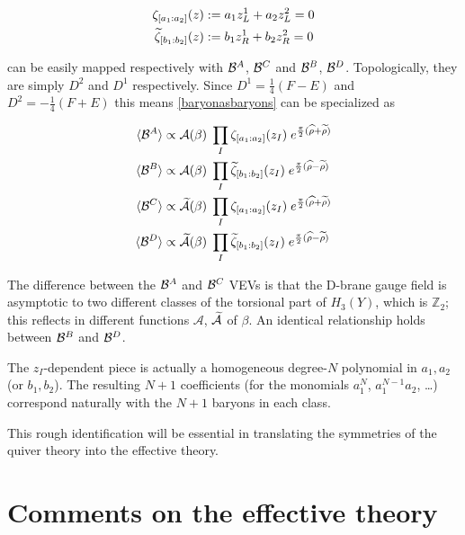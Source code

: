 \begin{align}
	\zeta_{[a_1:a_2]} (z) &:= a_1 z_L^1 + a_2 z_L^2 = 0\\
	\widetilde{\zeta}_{[b_1:b_2]} (z) &:= b_1 z_R^1 + b_2 z_R^2 = 0
	\label{}
\end{align}

can be easily mapped respectively with $\mathcal{B}^A$, $\mathcal{B}^C$ and $\mathcal{B}^B$, $\mathcal{B}^D$. Topologically, they are simply $D^2$ and $D^1$ respectively. Since $D^1 = \frac{1}{4}(F-E)$ and $D^2 = -\frac{1}{4}(F+E)$ this means \eqref{baryonasbaryons} can be specialized as

\begin{align}
	\begin{split}
	\langle\mathcal{B}^A\rangle &\propto \mathcal{A}(\beta)\; \prod_I \zeta_{[a_1:a_2]} (z_I) \; e^{\frac{\pi}{2} (\widehat{\rho} + \widetilde{\rho})}\\	
	\langle\mathcal{B}^B\rangle &\propto \mathcal{A}(\beta)\; \prod_I \widetilde{\zeta}_{[b_1:b_2]} (z_I) \; e^{\frac{\pi}{2} (\widehat{\rho} - \widetilde{\rho})}\\
	\langle\mathcal{B}^C\rangle &\propto \widetilde{\mathcal{A}}(\beta)\; \prod_I \zeta_{[a_1:a_2]} (z_I) \; e^{\frac{\pi}{2} (\widehat{\rho} + \widetilde{\rho})}\\
	\langle\mathcal{B}^D\rangle &\propto \widetilde{\mathcal{A}}(\beta)\; \prod_I \widetilde{\zeta}_{[b_1:b_2]} (z_I) \; e^{\frac{\pi}{2} (\widehat{\rho} - \widetilde{\rho})}
	\label{BasRhos}\end{split}
\end{align}

The difference between the $\mathcal{B}^A$ and $\mathcal{B}^C$ VEVs is that the D-brane gauge field is asymptotic to two different classes of the torsional part of $H_3(Y)$, which is $\mathbb{Z}_2$; this reflects in different functions $\mathcal{A}$, $\widetilde{\mathcal{A}}$ of $\beta$. An identical relationship holds between $\mathcal{B}^B$ and $\mathcal{B}^D$. 

The $z_I$-dependent piece is actually a homogeneous degree-$N$ polynomial in $a_1,a_2$ (or $b_1,b_2$). The resulting $N+1$ coefficients (for the monomials $a_1^N$, $a_1^{N-1} a_2$, \ldots) correspond naturally with the $N+1$ baryons in each class.

This rough identification will be essential in translating the symmetries of the quiver theory into the effective theory.

\section{Comments on the effective theory}

